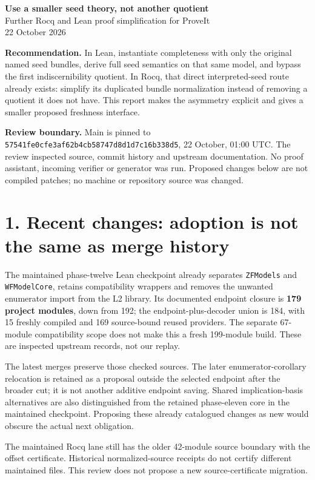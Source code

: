 \documentclass[10pt]{article}
\newcommand{\code}[1]{\texttt{#1}}
\begin{document}
\begin{center}{\Large\bfseries Use a smaller seed theory, not another quotient}\\[6pt]
Further Rocq and Lean proof simplification for ProveIt\\22 October 2026\end{center}
\textbf{Recommendation.} In Lean, instantiate completeness with only the original named seed bundles, derive full seed semantics on that same model, and bypass the first indiscernibility quotient. In Rocq, that direct interpreted-seed route already exists: simplify its duplicated bundle normalization instead of removing a quotient it does not have. This report makes the asymmetry explicit and gives a smaller proposed freshness interface.

\textbf{Review boundary.} Main is pinned to
\code{57541fe0cfe3af62b4cb58747d8d1d7c16b338d5}, 22 October, 01:00 UTC.
The review inspected source, commit history and upstream documentation. No proof assistant, incoming verifier or generator was run. Proposed changes below are not compiled patches; no machine or repository source was changed.

\section*{1. Recent changes: adoption is not the same as merge history}
The maintained phase-twelve Lean checkpoint already separates \code{ZFModels} and \code{WFModelCore}, retains compatibility wrappers and removes the unwanted enumerator import from the L2 library. Its documented endpoint closure is \textbf{179 project modules}, down from 192; the endpoint-plus-decoder union is 184, with 15 freshly compiled and 169 source-bound reused providers. The separate 67-module compatibility scope does not make this a fresh 199-module build. These are inspected upstream records, not our replay.

The latest merges preserve those checked sources. The later enumerator-corollary relocation is retained as a proposal outside the selected endpoint after the broader cut; it is not another additive endpoint saving. Shared implication-basis alternatives are also distinguished from the retained phase-eleven core in the maintained checkpoint. Proposing these already catalogued changes as new would obscure the actual next obligation.

The maintained Rocq lane still has the older 42-module source boundary with the offset certificate. Historical normalized-source receipts do not certify different maintained files. This review does not propose a new source-certificate migration.
\end{document}

